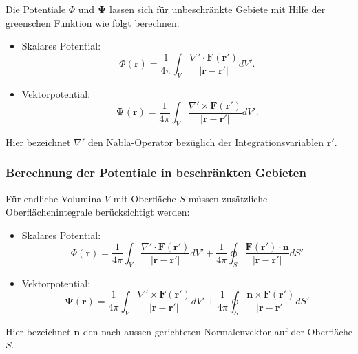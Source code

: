 Die Potentiale $\Phi$ und $\boldsymbol{\Psi}$ lassen sich für unbeschränkte Gebiete mit Hilfe der greenschen Funktion wie folgt berechnen:

\begin{itemize}
\item Skalares Potential:
\begin{equation}
\Phi(\boldsymbol{r}) = \frac{1}{4 \pi} \int_{V} \frac{\nabla' \cdot \boldsymbol{F}(\boldsymbol{r'})}{|\boldsymbol{r} - \boldsymbol{r'}|} dV'.
\end{equation}

\item Vektorpotential:
\begin{equation}
\boldsymbol{\Psi}(\boldsymbol{r}) = \frac{1}{4 \pi} \int_{V} \frac{\nabla' \times \boldsymbol{F}(\boldsymbol{r'})}{|\boldsymbol{r} - \boldsymbol{r'}|} dV'.
\end{equation}
\end{itemize}
Hier bezeichnet $\nabla'$ den Nabla-Operator bezüglich der Integrationsvariablen $\boldsymbol{r'}$.

\subsubsection{Berechnung der Potentiale in beschränkten Gebieten}

Für endliche Volumina $V$ mit Oberfläche $S$ müssen zusätzliche Oberflächenintegrale berücksichtigt werden:

\begin{itemize}
\item Skalares Potential:
\begin{equation}
\Phi (\boldsymbol{r}) = \frac{1}{4\pi} \int_V \frac{\nabla' \cdot \boldsymbol{F}(\boldsymbol{r}')}{|\boldsymbol{r} - \boldsymbol{r}'|} dV' + \frac{1}{4\pi} \oint_S \frac{\boldsymbol{F}(\boldsymbol{r}') \cdot \boldsymbol{n}}{|\boldsymbol{r} - \boldsymbol{r}'|} dS'
\end{equation}

\item Vektorpotential:
\begin{equation}
\boldsymbol{\Psi}(\boldsymbol{r}) = \frac{1}{4\pi} \int_V \frac{\nabla' \times \boldsymbol{F}(\boldsymbol{r}')}{|\boldsymbol{r} - \boldsymbol{r}'|} dV' + \frac{1}{4\pi} \oint_S \frac{\boldsymbol{n} \times \boldsymbol{F}(\boldsymbol{r}')}{|\boldsymbol{r} - \boldsymbol{r}'|} dS'
\end{equation}
\end{itemize}
Hier bezeichnet $\boldsymbol{n}$ den nach aussen gerichteten Normalenvektor auf der Oberfläche $S$.

